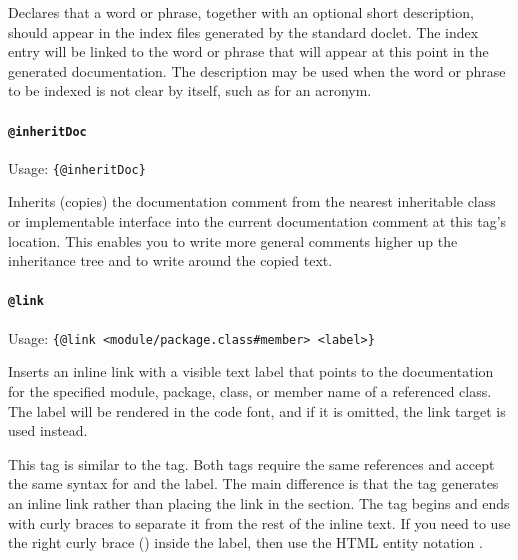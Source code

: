 Declares that a word or phrase, together with an optional short description, should appear in the index files generated by the standard doclet. The index entry will be linked to the word or phrase that will appear at this point in the generated documentation. The description may be used when the word or phrase to be indexed is not clear by itself, such as for an acronym.


\paragraph{\lstinline|@inheritDoc|}\label{sec:TagInheritDoc}  Usage: \lstinline|{@inheritDoc}|

Inherits (copies) the documentation comment from the nearest inheritable class or implementable interface into the current documentation comment at this tag's location. This enables you to write more general comments higher up the inheritance tree and to write around the copied text.


\paragraph{\lstinline|@link|}\label{sec:TagLink}  Usage: \lstinline|{@link <module/package.class#member> <label>}|

Inserts an inline link with a visible text label that points to the documentation for the specified module, package, class, or member name of a referenced class. The label will be rendered in the code font, and if it is omitted, the link target is used instead.

This tag is similar to the  tag. Both tags require the same references and accept the same syntax for  and the label. The main difference is that the  tag generates an inline link rather than placing the link in the  section. The  tag begins and ends with curly braces to separate it from the rest of the inline text. If you need to use the right curly brace (\bdq{\}}) inside the label, then use the HTML entity notation .

